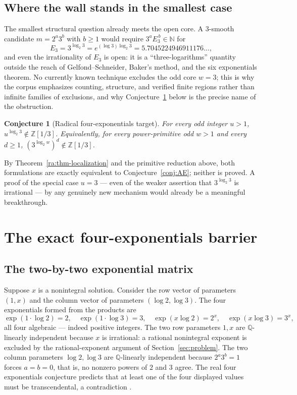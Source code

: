 \documentclass[11pt,oneside]{article}
\newtheorem{conjecture}[theorem]{Conjecture}
\theoremstyle{definition}
\theoremstyle{remark}
\newcommand{\N}{\mathbb N}
\newcommand{\Z}{\mathbb Z}
\newcommand{\Q}{\mathbb Q}
\newcommand{\Zthree}{\Z[1/3]}
\begin{document}
\subsection{Where the wall stands in the smallest case}

The smallest structural question already meets the open core.  A $3$-smooth candidate
$m=2^a3^b$ with $b\ge1$ would require $3^aE_3^{\,b}\in\N$ for
\[
E_3=3^{\log_2 3}=e^{(\log3)\log_2 3}=5.7045224946911176\ldots,
\]
and even the irrationality of $E_3$ is open: it is a ``three-logarithms'' quantity outside
the reach of Gelfond--Schneider, Baker's method, and the six exponentials theorem.  No
currently known technique excludes the odd core $w=3$; this is why the corpus emphasizes
counting, structure, and verified finite regions rather than infinite families of
exclusions, and why Conjecture~\ref{ra:conj-radical-target} below is the precise name of the
obstruction.

\begin{conjecture}[Radical four-exponentials target]
\label{ra:conj-radical-target}
For every odd integer $u>1$, $u^{\log_2 3}\notin\Zthree$.  Equivalently, for every
power-primitive odd $w>1$ and every $d\ge1$, $(3^{\log_2w})^d\notin\Zthree$.
\end{conjecture}

By Theorem~\ref{ra:thm-localization} and the primitive reduction above, both formulations
are exactly equivalent to Conjecture~\ref{conj:AE}; neither is proved.  A proof of the
special case $u=3$ --- even of the weaker assertion that $3^{\log_2 3}$ is irrational --- by
any genuinely new mechanism would already be a meaningful breakthrough.

\section{The exact four-exponentials barrier}
\label{sec:barrier}
\label{sec:fourexp}

\subsection{The two-by-two exponential matrix}

Suppose $x$ is a nonintegral solution.  Consider the row vector of parameters $(1,x)$ and
the column vector of parameters $(\log2,\log3)$.  The four exponentials formed from the
products are
\[
\exp(1\cdot\log2)=2,\quad
\exp(1\cdot\log3)=3,\quad
\exp(x\log2)=2^x,\quad
\exp(x\log3)=3^x,
\]
all four algebraic --- indeed positive integers.  The two row parameters $1,x$ are
$\Q$-linearly independent because $x$ is irrational: a rational nonintegral exponent is
excluded by the rational-exponent argument of Section~\ref{sec:problem}.  The two column
parameters $\log2,\log3$ are $\Q$-linearly independent because $2^a3^b=1$ forces $a=b=0$,
that is, no nonzero powers of $2$ and $3$ agree.  The real four exponentials conjecture
predicts that at least one of the four displayed values must be transcendental, a
contradiction \cite{Waldschmidt2000}.
\end{document}
